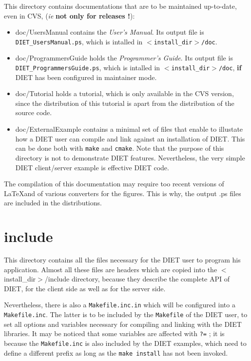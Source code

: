 This directory contains documentations that are to be maintained up-to-date,
even in CVS, (\emph{ie} \textbf{not only for releases !}):

  \begin{itemize}
  \item \textsf{doc/UsersManual} contains the \textit{User's Manual}. 
     Its output file is \texttt{DIET\_UsersManual.ps}, which is intalled in
     \texttt{$<$install\_dir$>$/doc}.
  \item \textsf{doc/ProgrammersGuide} holds the \textit{Programmer's Guide}.
     Its output file is \texttt{DIET\_ProgrammersGuide.ps}, which is intalled
     in \texttt{$<$install\_dir$>$/doc}, \textbf{if} DIET has been configured
     in maintainer mode.
  \item \textsf{doc/Tutorial} holds a tutorial, which is only available
     in the CVS version, since the distribution of this tutorial is apart
     from the distribution of the source code.
  \item \textsf{doc/ExternalExample} contains a minimal set of files
     that enable to illustate how a DIET user can compile and link
     against an installation of DIET.
     This can be done both with \verb+make+ and \verb+cmake+.
     Note that the purpose of this directory is not to demonstrate
     DIET features.
     Nevertheless, the very simple DIET client/server example is effective
     DIET code.
  \end{itemize}

  The compilation of this documentation may require too recent versions of
  \LaTeX and of various converters for the figures.
  This is why, the output \textsf{.ps} files are included in the distributions.

  \section{\textsf{include}}
  \label{s:include}

  This directory contains all the files necessary for the DIET user to program his
  application. Almost all these files are headers which are copied into the
  \textsf{$<$install\_dir$>$/include} directory, because they describe the
  complete API of DIET, for the client side as well as for the server side.

  Nevertheless, there is also a \texttt{Makefile.inc.in} which will be configured
  into a \texttt{Makefile.inc}.
  The latter is to be included by the \texttt{Makefile} of the
  DIET user, to set all options and variables necessary for compiling and
  linking with the DIET libraries.
  It may be noticed that some variables are affected with
  \texttt{?=} ; it is because the \texttt{Makefile.inc} is also included by the
  DIET examples, which need to define a different prefix as long as the
  \texttt{make install} has not been invoked.



